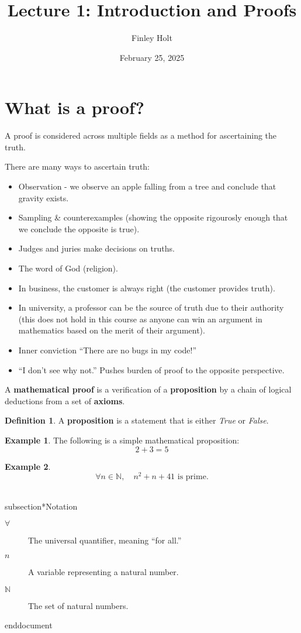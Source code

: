 \documentclass[11pt]{article}
\theoremstyle{definition}
\newtheorem{definition}{Definition}
\newtheorem{example}{Example}
\begin{document}
\title{Lecture 1: Introduction and Proofs}
\author{Finley Holt}
\date{February 25, 2025}
\maketitle

\section{What is a proof?}

A proof is considered across multiple fields as a method for ascertaining the truth.

There are many ways to ascertain truth:

\begin{itemize}
    \item Observation - we observe an apple falling from a tree and conclude that gravity exists.
    \item Sampling \& counterexamples (showing the opposite rigourosly enough that we conclude the opposite is true).
    \item Judges and juries make decisions on truths.
    \item The word of God (religion).
    \item In business, the customer is always right (the customer provides truth).
    \item In university, a professor can be the source of truth due to their authority (this does not hold in this course as anyone can win an argument in mathematics based on the merit of their argument).
    \item Inner conviction ``There are no bugs in my code!''
    \item ``I don't see why not.'' Pushes burden of proof to the opposite perspective.
\end{itemize}

A \textbf{mathematical proof} is a verification of a \textbf{proposition} by a chain of logical deductions from a set of \textbf{axioms}.

\begin{definition}
A \textbf{proposition} is a statement that is either \textit{True} or \textit{False}.
\end{definition}

\begin{example}
The following is a simple mathematical proposition:
\[
2 + 3 = 5
\]
\end{example}

\begin{example}
\[
\forall n \in \mathbb{N}, \quad n^2 + n + 41 \text{ is prime}.
\]
\end{example}

\\subsection*{Notation}
\begin{description}
  \item[$\forall$] The universal quantifier, meaning ``for all.''
  \item[$n$] A variable representing a natural number.
  \item[$\mathbb{N}$] The set of natural numbers.
\end{description}

end{document}
\end{document}
